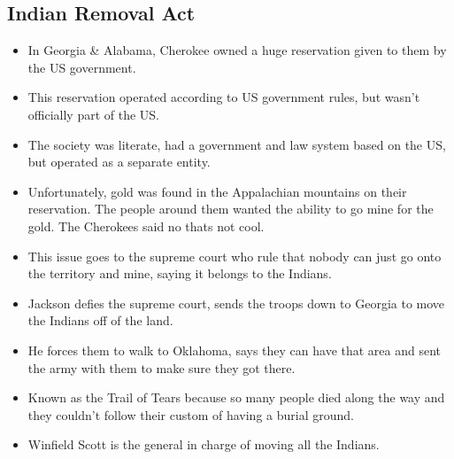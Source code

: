 \documentclass{article}
\begin{document}
      \subsection{Indian Removal Act}
        \begin{itemize}
          \item In Georgia \& Alabama, Cherokee owned a huge reservation given to them by the US government. 
          \item This reservation operated according to US government rules, but wasn't officially part of the US.
          \item The society was literate, had  a government and law system based on the US, but operated as a separate entity. 
          \item Unfortunately, gold was found in the Appalachian mountains on their reservation. The people around them wanted the ability to go mine for the gold. The Cherokees said no thats not cool.
          \item This issue goes to the supreme court who rule that nobody can just go onto the territory and mine, saying it belongs to the Indians.
          \item Jackson defies the supreme court, sends the troops down to Georgia to move the Indians off of the land.
          \item He forces them to walk to Oklahoma, says they can have that area and sent the army with them to make sure they got there.
          \item Known as the Trail of Tears because so many people died along the way and they couldn't follow their custom of having a burial ground.
          \item Winfield Scott is the general in charge of moving all the Indians.
        \end{itemize}
\end{document}
